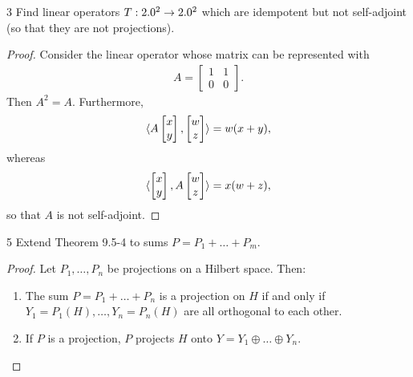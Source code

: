 \begin{exercise}{3}
Find linear operators $T: 2.0^2 \to 2.0^2$ which are idempotent but not self-adjoint (so that they are not projections).
\end{exercise}
\begin{proof}
Consider the linear operator whose matrix can be represented with
\begin{align*}
    A = \begin{bmatrix}
        1 & 1\\
        0 & 0
    \end{bmatrix}.
\end{align*}
Then $A^2 = A$.
Furthermore,
\begin{align*}
    \langle A 
    \begin{bmatrix}
        x\\
        y
    \end{bmatrix},
    \begin{bmatrix}
        w\\
        z
    \end{bmatrix}\rangle
    = w (x + y),
\end{align*}
whereas
\begin{align*}
    \langle 
    \begin{bmatrix}
        x\\
        y
    \end{bmatrix},
    A
    \begin{bmatrix}
        w\\
        z
    \end{bmatrix}\rangle
    = x (w + z),
\end{align*}
so that $A$ is not self-adjoint.
\end{proof} 

\begin{exercise}{5}
Extend Theorem 9.5-4 to sums $P = P_1 + \dots + P_m$.
\end{exercise}
\begin{proof}
Let $P_1, \dots, P_n$ be projections on a Hilbert space.
Then:
\begin{enumerate}
    \item The sum $P = P_1 + \dots + P_n$ is a projection on $H$ if and only if $Y_1 = P_1(H), \dots, Y_n = P_n(H)$ are all orthogonal to each other.
    \item If $P$ is a projection, $P$ projects $H$ onto $Y = Y_1 \oplus \dots \oplus Y_n$.
\end{enumerate}
\end{proof} 

